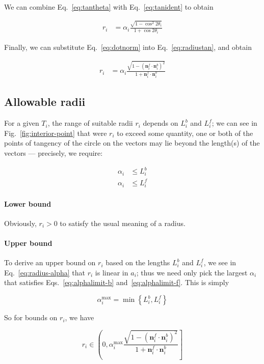 \documentclass{article}
\begin{document}
We can combine Eq.~\eqref{eq:tantheta} with Eq.~\eqref{eq:tanident} to obtain

\begin{align}
  \label{eq:radiustan}
  r_{i} &= \alpha_i\frac{\sqrt{1-\cos^{2} 2\theta_i}}{1+\cos 2\theta_i}
\end{align}

Finally, we can substitute Eq.~\eqref{eq:dotnorm} into Eq.~\eqref{eq:radiustan}, and obtain

\begin{align}
  \label{eq:radius-alpha}
  r_{i} &= \alpha_i\frac{\sqrt{1-\left(\mathbf{n}^f_i\cdot \mathbf{n}^b_i\right)^{2}}}{1+\mathbf{n}^f_i\cdot \mathbf{n}^b_i}
\end{align}

\subsection{Allowable radii}

For a given $T_{i}$, the range of suitable radii $r_{i}$ depends on $L^b_i$ and $L^f_i$; we can see in Fig.~\ref{fig:interior-point} that were $r_{i}$ to exceed some quantity, one or both of the points of tangency of the circle on the vectors may lie beyond the length(s) of the vectors --- precisely, we require:

\begin{align}
  \label{eq:alphalimit-b}
  \alpha_i &\le L^{b}_{i}\\
  \label{eq:alphalimit-f}
  \alpha_i &\le L^{f}_{i}
\end{align}

\paragraph{Lower bound}

Obviously, $r_i > 0$ to satisfy the usual meaning of a radius.

\paragraph{Upper bound}

To derive an upper bound on $r_{i}$ based on the lengths $L^b_i$ and $L^f_i$, we see in Eq.~\eqref{eq:radius-alpha} that $r_{i}$ is linear in $a_{i}$; thus we need only pick the largest $\alpha_i$ that satisfies Eqs.~\eqref{eq:alphalimit-b} and~\eqref{eq:alphalimit-f}.  This is simply

\begin{equation}
  \label{eq:alpha-max}
  \alpha^{\max}_i = \min \left\{L^{b}_{i}, L^{f}_{i}\right\}
\end{equation}

So for bounds on $r_{i}$, we have

\begin{equation}
  \label{eq:rbounds}
  r_{i} \in \left(0, \alpha^{\max}_i \frac{\sqrt{1-\left(\mathbf{n}^f_i\cdot \mathbf{n}^b_i\right)^{2}}}{1+\mathbf{n}^f_i\cdot \mathbf{n}^b_i}\right]
\end{equation}
\end{document}
